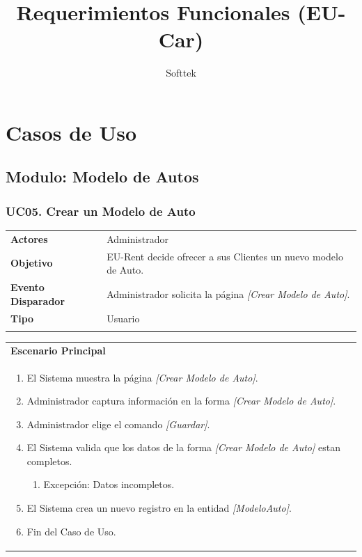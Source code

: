 \documentclass[10pt, letterpaper]{report}
\begin{document}
\title{Requerimientos Funcionales (EU-Car)}
\author{Softtek}
\date{}
\maketitle

\pagestyle{plain}
\tableofcontents

\chapter{Casos de Uso}


\section{Modulo: Modelo de Autos} \label{sec:cumodeloautoservices}

\subsection{UC05. Crear un Modelo de Auto} \label{sec:cucrearmodeloauto}

\begin{tabular}{ p{3.5cm} p{11.5cm} }
	\textbf{Actores} & Administrador \\
	\textbf{Objetivo} & EU-Rent decide ofrecer a sus Clientes un nuevo modelo de Auto. \\
	\textbf{Evento Disparador} & Administrador solicita la página \textit{[Crear Modelo de Auto]}. \\
	\textbf{Tipo} & Usuario \\
	\\
\end{tabular}

\begin{tabular}{ p{15.5cm} }
	\textbf{Escenario Principal} \\
	\begin{enumerate}
		\item El Sistema muestra la página \textit{[Crear Modelo de Auto]}.
		\item Administrador captura información en la forma \textit{[Crear Modelo de Auto]}.
		\item Administrador elige el comando \textit{[Guardar]}.
		\item El Sistema valida que los datos de la forma \textit{[Crear Modelo de Auto]} estan completos.
			\begin{enumerate}
				\item Excepción: Datos incompletos.
			\end{enumerate}
		\item El Sistema crea un nuevo registro en la entidad \textit{[ModeloAuto]}.
		\item Fin del Caso de Uso.
	\end{enumerate} \\
\end{tabular}
\end{document}
